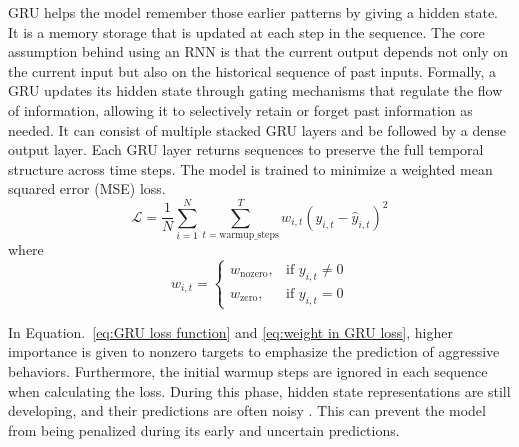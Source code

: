 GRU helps the model remember those earlier patterns by giving a hidden state. It is a memory storage that is updated at each step in the sequence. The core assumption behind using an RNN is that the current output depends not only on the current input but also on the historical sequence of past inputs. Formally, a GRU updates its hidden state through gating mechanisms that regulate the flow of information, allowing it to selectively retain or forget past information as needed. It can consist of multiple stacked GRU layers and be followed by a dense output layer. Each GRU layer returns sequences to preserve the full temporal structure across time steps. The model is trained to minimize a weighted mean squared error (MSE) loss. 
\begin{equation}
    \mathcal{L} = \frac{1}{N} \sum_{i=1}^{N} \sum_{t=\text{warmup\_steps}}^{T} w_{i,t} \left( y_{i,t} - \hat{y}_{i,t} \right)^2
    \label{eq:GRU loss function}
\end{equation}
    where
\begin{equation}
    w_{i,t} =
    \begin{cases}
    w_\text{nozero}, & \text{if } y_{i,t} \neq 0 \\
    w_\text{zero}, & \text{if } y_{i,t} = 0
    \end{cases}
    \label{eq:weight in GRU loss}
\end{equation}
    
In Equation.~\ref{eq:GRU loss function} and \ref{eq:weight in GRU loss}, higher importance is given to nonzero targets to emphasize the prediction of aggressive behaviors. Furthermore, the initial warmup steps are ignored in each sequence when calculating the loss. During this phase, hidden state representations are still developing, and their predictions are often noisy \citep{lambrechts2023warmingrecurrentneuralnetworks}. This can prevent the model from being penalized during its early and uncertain predictions.

